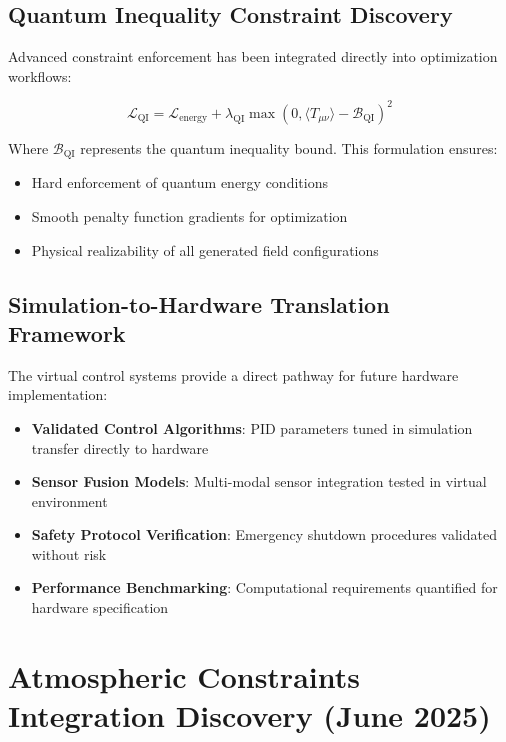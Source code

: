 \documentclass[11pt]{article}
\begin{document}
\subsection{Quantum Inequality Constraint Discovery}

Advanced constraint enforcement has been integrated directly into optimization workflows:

\begin{equation}
\mathcal{L}_{\text{QI}} = \mathcal{L}_{\text{energy}} + \lambda_{\text{QI}} \max(0, \langle T_{\mu\nu} \rangle - \mathcal{B}_{\text{QI}})^2
\end{equation}

Where $\mathcal{B}_{\text{QI}}$ represents the quantum inequality bound. This formulation ensures:
\begin{itemize}
\item Hard enforcement of quantum energy conditions
\item Smooth penalty function gradients for optimization
\item Physical realizability of all generated field configurations
\end{itemize}

\subsection{Simulation-to-Hardware Translation Framework}

The virtual control systems provide a direct pathway for future hardware implementation:

\begin{itemize}
\item \textbf{Validated Control Algorithms}: PID parameters tuned in simulation transfer directly to hardware
\item \textbf{Sensor Fusion Models}: Multi-modal sensor integration tested in virtual environment
\item \textbf{Safety Protocol Verification}: Emergency shutdown procedures validated without risk
\item \textbf{Performance Benchmarking}: Computational requirements quantified for hardware specification
\end{itemize}

\section{Atmospheric Constraints Integration Discovery (June 2025)}
\end{document}
